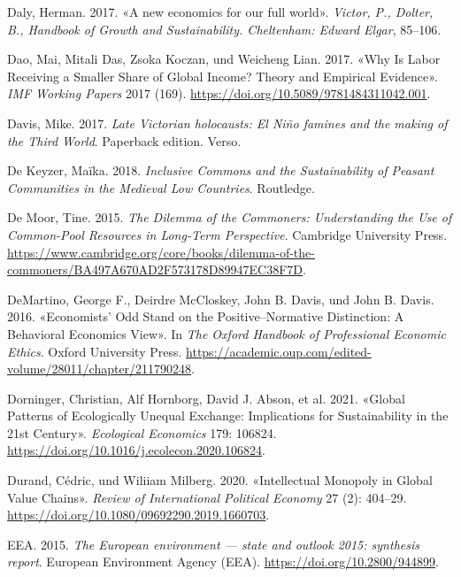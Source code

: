 \documentclass[
  nswissgerman,
  a4paper,
  DIV=11,
  numbers=noendperiod,
  oneside,
  openany]{scrreprt}
\newlength{\cslhangindent}
\newenvironment{CSLReferences}[2] %
 {\begin{list}{}{%
  \setlength{\itemindent}{0pt}
  \setlength{\leftmargin}{0pt}
  \setlength{\parsep}{0pt}
  \ifodd #1
   \setlength{\leftmargin}{\cslhangindent}
   \setlength{\itemindent}{-1\cslhangindent}
  \fi
  \setlength{\itemsep}{#2\baselineskip}}}
 {\end{list}}
\begin{document}
\begin{CSLReferences}{1}{1}
Daly, Herman. 2017. {«A new economics for our full world»}.
\emph{Victor, P., Dolter, B., Handbook of Growth and Sustainability.
Cheltenham: Edward Elgar}, 85--106.

Dao, Mai, Mitali Das, Zsoka Koczan, und Weicheng Lian. 2017. {«Why {Is}
{Labor} {Receiving} a {Smaller} {Share} of {Global} {Income}? {Theory}
and {Empirical} {Evidence}»}. \emph{IMF Working Papers} 2017 (169).
\url{https://doi.org/10.5089/9781484311042.001}.

Davis, Mike. 2017. \emph{Late Victorian holocausts: El Niño famines and
the making of the Third World}. Paperback edition. Verso.

De Keyzer, Maïka. 2018. \emph{Inclusive Commons and the Sustainability
of Peasant Communities in the Medieval Low Countries}. Routledge.

De Moor, Tine. 2015. \emph{The Dilemma of the Commoners: Understanding
the Use of Common-Pool Resources in Long-Term Perspective}. Cambridge
University Press.
\url{https://www.cambridge.org/core/books/dilemma-of-the-commoners/BA497A670AD2F573178D89947EC38F7D}.

DeMartino, George F., Deirdre McCloskey, John B. Davis, und John B.
Davis. 2016. {«Economists' Odd Stand on the Positive--Normative
Distinction: A Behavioral Economics View»}. In \emph{The Oxford Handbook
of Professional Economic Ethics}. Oxford University Press.
\url{https://academic.oup.com/edited-volume/28011/chapter/211790248}.

Dorninger, Christian, Alf Hornborg, David J. Abson, et al. 2021.
{«Global Patterns of Ecologically Unequal Exchange: Implications for
Sustainability in the 21st Century»}. \emph{Ecological Economics} 179:
106824. \url{https://doi.org/10.1016/j.ecolecon.2020.106824}.

Durand, Cédric, und Wiliiam Milberg. 2020. {«Intellectual Monopoly in
Global Value Chains»}. \emph{Review of International Political Economy}
27 (2): 404--29. \url{https://doi.org/10.1080/09692290.2019.1660703}.

EEA. 2015. \emph{The {European} environment --- state and outlook 2015:
synthesis report}. European Environment Agency (EEA).
\url{https://doi.org/10.2800/944899}.


\end{CSLReferences}
\end{document}
